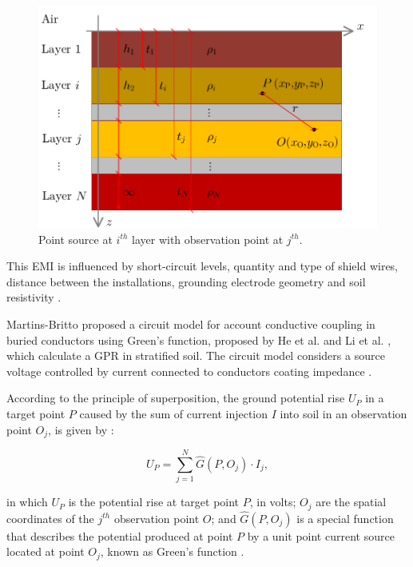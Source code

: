 \documentclass{IEEEtran4PSCC}
\begin{document}
\begin{figure}[hbt]
	\begin{center}
		\includegraphics[width=1\columnwidth]{./fig/green_nla.pdf}
		\caption{Point source at $i^{th}$ layer with observation point at $j^{th}$.}
		\label{fig:Greens}
	\end{center}
\end{figure}

This EMI is influenced by short-circuit levels, quantity and type of shield wires, distance between the installations, grounding electrode geometry and soil resistivity \cite{CIGREWG36}.

Martins-Britto \cite{Martins-Britto2020} proposed a circuit model for account conductive coupling in buried conductors using Green's function, proposed by He et al. \cite{He2012} and Li et al. \cite{Li2006}, which calculate a GPR in stratified soil. The circuit model considers a source voltage controlled by current connected to conductors coating impedance \cite{Martins-Britto2020}.

According to the principle of superposition, the ground potential rise $U_{P}$ in a target point $P$ caused by  the sum of current injection $I$ into soil in an observation point $O_{j}$, is given by \cite{Li2006}:

\begin{equation}
	U_{P} = \sum_{j=1}^{N} \hat{G}(P,O_{j})\cdot I_{j},
\end{equation} 

\noindent in which $U_{P}$ is the potential rise at target point $P$, in volts; $O_{j}$ are the spatial coordinates of the $j^{th}$ observation point $O$; and $\hat{G}(P,O_{j})$ is a special function that describes the potential produced at point $P$ by a unit point current source located at point $O_{j}$, known as Green's function \cite{Li2006,Martins-Britto2020}.
\end{document}
